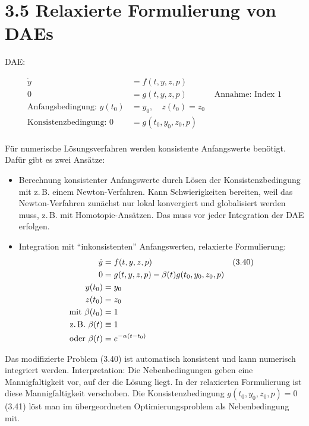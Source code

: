 \section*{3.5 Relaxierte Formulierung von DAEs}

DAE:

\begin{align*}
\dot y &= f(t,y,z,p) \\
0 &= g(t,y,z,p) & \text{ Annahme: Index 1}\\
\text{Anfangsbedingung: } y(t_0) &= y_0, \quad z(t_0) = z_0\\
\text{Konsistenzbedingung: } 0 &= g(t_0, y_0, z_0, p) \\
\end{align*}

Für numerische Lösungsverfahren werden konsistente Anfangswerte benötigt. Dafür gibt es zwei Ansätze:

\begin{itemize}
\item Berechnung konsistenter Anfangswerte durch Lösen der Konsistenzbedingung mit z.\,B. einem Newton-Verfahren. Kann Schwierigkeiten bereiten, weil das Newton-Verfahren zunächst nur lokal konvergiert und globalisiert werden muss, z.\,B. mit Homotopie-Ansätzen. Das muss vor jeder Integration der DAE erfolgen.
\item Integration mit "`inkonsistenten"' Anfangswerten, relaxierte Formulierung:
\begin{align*}
\dot y &= f(t,y,z,p) & (3.40) \\
0 &= g(t,y,z,p) - \beta(t) g(t_0,y_0,z_0,p) \\
y(t_0) &= y_0 \\
z(t_0) &= z_0 \\
\text{mit } \beta(t_0) &= 1 \\
\text{z.\,B. } \beta(t) &\equiv 1 \\
\text{oder } \beta(t) &= e^{-\alpha(t-t_0)} \\
\end{align*}
\end{itemize}

Das modifizierte Problem (3.40) ist automatisch konsistent und kann numerisch integriert werden. Interpretation: Die Nebenbedingungen geben eine Mannigfaltigkeit vor, auf der die Lösung liegt. In der relaxierten Formulierung ist diese Mannigfaltigkeit verschoben. Die Konsistenzbedingung $g(t_0,y_0,z_0,p) = 0$ (3.41) löst man im übergeordneten Optimierungsproblem als Nebenbedingung mit.

